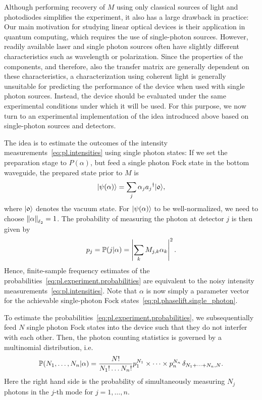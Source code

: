 Although performing recovery of $M$ using only classical sources of light and photodiodes simplifies the experiment, it also has a large drawback in practice:
Our main motivation for studying linear optical devices is their application in quantum computing, which requires the use of single-photon sources.
However, readily available laser and single photon sources often have slightly different characteristics such as wavelength or polarization.
Since the properties of the components, and therefore, also the transfer matrix are generally dependent on these characteristics, a characterization using coherent light is generally unsuitable for predicting the performance of the device when used with single photon sources.
Instead, the device should be evaluated under the same experimental conditions under which it will be used.
For this purpose, we now turn to an experimental implementation of the idea introduced above based on single-photon sources and detectors.

The idea is to estimate the outcomes of the intensity measurements~\eqref{eq:pl.intensities} using single photon states:
If we set the preparation stage to $P(\alpha)$, but feed a single photon Fock state in the bottom waveguide, the prepared state prior to $M$ is
\[
  \label{eq:pl.phaselift.single_photon}
  \ket{\psi({\alpha})} = \sum_j \alpha_j \adj{a_j} \ket{\mathfrak{0}},
\]
where $\ket{\mathfrak{0}}$ denotes the vacuum state.
For $\ket{{\psi(\alpha)}}$ to be well-normalized, we need to choose ${\Vert\alpha\Vert}_{\ell_2} = 1$.
The probability of measuring the photon at detector $j$ is then given by
\[
  p_j = \mathbb{P}(j|{\alpha}) = \left| \sum_k M_{j,k} \alpha_k \right|^2.
  \label{eq:pl.experiment.probabilities}
\]
Hence, finite-sample frequency estimates of the probabilities~\eqref{eq:pl.experiment.probabilities} are equivalent to the noisy intensity measurements~\eqref{eq:pl.intensities}.
Note that $\alpha$ is now simply a parameter vector for the achievable single-photon Fock states~\eqref{eq:pl.phaselift.single_photon}.

To estimate the probabilities~\eqref{eq:pl.experiment.probabilities}, we subsequentially feed $N$ single photon Fock states into the device such that they do not interfer with each other.
Then, the photon counting statistics is governed by a multinomial distribution, i.e.
\[
\mathbb{P}(N_1, \ldots, N_n | \alpha) = \frac{N!}{N_1! \ldots N_n!}  p_1^{N_1} \times \cdots \times p_n^{N_n}  \, \delta_{N_1 + \cdots + N_n, N}.
  \label{eq:pl.photon_stats}
\]
Here the right hand side is the probability of simultaneously measuring $N_j$ photons in the $j$-th mode for $j=1,\ldots,n$.


